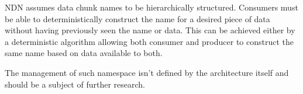                 NDN assumes data chunk names to be hierarchically structured. Consumers must be able to deterministically construct the name for a desired piece of data without having previously seen the name or data. This can be achieved either by a deterministic algorithm allowing both consumer and producer to construct the same name based on data available to both.

                The management of such namespace isn't defined by the architecture itself and should be a subject of further research.



